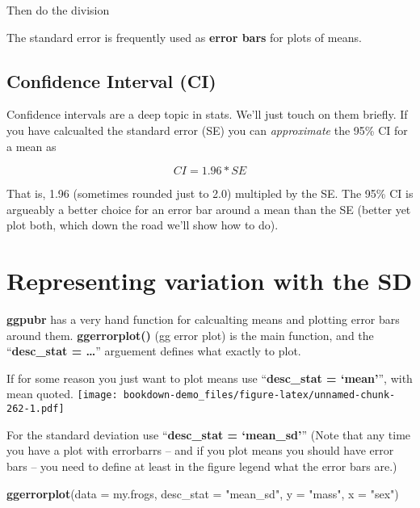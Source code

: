 \documentclass[]{book}
\newenvironment{Shaded}{\begin{snugshade}}{\end{snugshade}}
\newcommand{\KeywordTok}[1]{\textcolor[rgb]{0.13,0.29,0.53}{\textbf{#1}}}
\newcommand{\DataTypeTok}[1]{\textcolor[rgb]{0.13,0.29,0.53}{#1}}
\newcommand{\StringTok}[1]{\textcolor[rgb]{0.31,0.60,0.02}{#1}}
\newcommand{\OperatorTok}[1]{\textcolor[rgb]{0.81,0.36,0.00}{\textbf{#1}}}
\newcommand{\NormalTok}[1]{#1}
\theoremstyle{definition}
\theoremstyle{definition}
\theoremstyle{definition}
\theoremstyle{remark}
\begin{document}
\begin{Shaded}
\end{Shaded}

Then do the division

The standard error is frequently used as \textbf{error bars} for plots
of means.

\subsection{Confidence Interval (CI)}\label{confidence-interval-ci}

Confidence intervals are a deep topic in stats. We'll just touch on them
briefly. If you have calcualted the standard error (SE) you can
\emph{approximate} the 95\% CI for a mean as

\[CI = 1.96*SE\]

That is, 1.96 (sometimes rounded just to 2.0) multipled by the SE. The
95\% CI is argueably a better choice for an error bar around a mean than
the SE (better yet plot both, which down the road we'll show how to do).

\section{Representing variation with the
SD}\label{representing-variation-with-the-sd}

\textbf{ggpubr} has a very hand function for calcualting means and
plotting error bars around them. \textbf{ggerrorplot()} (gg error plot)
is the main function, and the ``\textbf{desc\_stat = \ldots{}}''
arguement defines what exactly to plot.

If for some reason you just want to plot means use ``\textbf{desc\_stat
= `mean'}'', with mean quoted.
\texttt{[image: bookdown-demo\_files/figure-latex/unnamed-chunk-262-1.pdf]}

For the standard deviation use ``\textbf{desc\_stat = `mean\_sd'}''
(Note that any time you have a plot with errorbarrs -- and if you plot
means you should have error bars -- you need to define at least in the
figure legend what the error bars are.)

\begin{Shaded}
\begin{Highlighting}[]
\KeywordTok{ggerrorplot}\NormalTok{(}\DataTypeTok{data =}\NormalTok{ my.frogs,}
            \DataTypeTok{desc_stat =} \StringTok{"mean_sd"}\NormalTok{,}
          \DataTypeTok{y =} \StringTok{"mass"}\NormalTok{,}
          \DataTypeTok{x =} \StringTok{"sex"}\NormalTok{)}
\end{Highlighting}
\end{Shaded}
\end{document}
